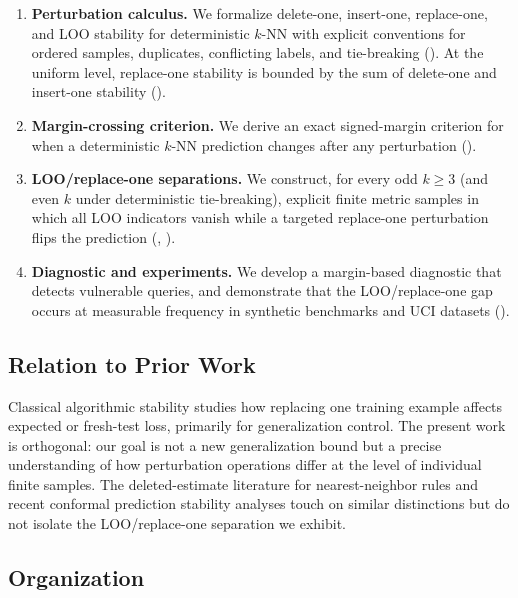 \begin{enumerate}[leftmargin=*,label=(\arabic*)]
    \item \textbf{Perturbation calculus.} We formalize delete-one, insert-one,
        replace-one, and LOO stability for deterministic $k$-NN with explicit
        conventions for ordered samples, duplicates, conflicting labels, and
        tie-breaking (). At the uniform level,
        replace-one stability is bounded by the sum of delete-one and
        insert-one stability ().
    \item \textbf{Margin-crossing criterion.} We derive an exact signed-margin
        criterion for when a deterministic $k$-NN prediction changes after any
        perturbation ().
    \item \textbf{LOO/replace-one separations.} We construct, for every odd
        $k \ge 3$ (and even $k$ under deterministic tie-breaking), explicit
        finite metric samples in which all LOO indicators vanish while a
        targeted replace-one perturbation flips the prediction
        (, ).
    \item \textbf{Diagnostic and experiments.} We develop a margin-based
        diagnostic that detects vulnerable queries, and demonstrate that the
        LOO/replace-one gap occurs at measurable frequency in synthetic
        benchmarks and UCI datasets ().
\end{enumerate}

\subsection*{Relation to Prior Work}

Classical algorithmic stability \cite{bousquet2002stability,kutin2002almost}
studies how replacing one training example affects expected or fresh-test
loss, primarily for generalization control. The present work is orthogonal:
our goal is not a new generalization bound but a precise understanding of how
perturbation operations differ at the level of individual finite samples. The
deleted-estimate literature for nearest-neighbor rules
\cite{rogers1978finite,devroye1979distribution} and recent conformal
prediction stability analyses \cite{liang2023algorithmic,pournaderi2024training}
touch on similar distinctions but do not isolate the LOO/replace-one
separation we exhibit.

\subsection*{Organization}

